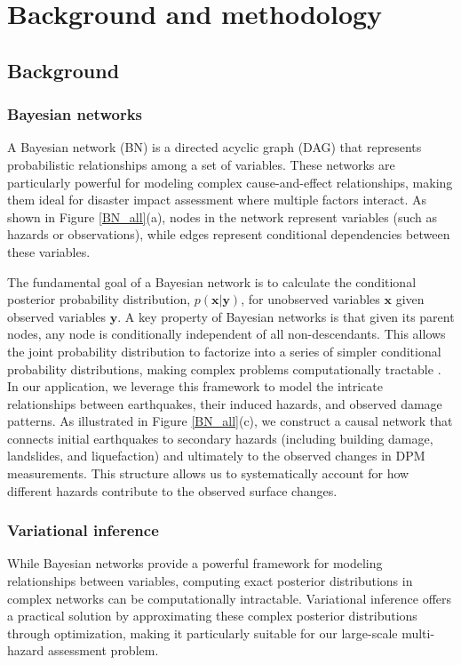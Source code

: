 \documentclass[review]{elsarticle}
\begin{document}
\section{Background and methodology}

\subsection{Background}
\subsubsection{Bayesian networks}
A Bayesian network (BN) is a directed acyclic graph (DAG) that represents probabilistic relationships among a set of variables. These networks are particularly powerful for modeling complex cause-and-effect relationships, making them ideal for disaster impact assessment where multiple factors interact. As shown in Figure \ref{BN_all}(a), nodes in the network represent variables (such as hazards or observations), while edges represent conditional dependencies between these variables.

The fundamental goal of a Bayesian network is to calculate the conditional posterior probability distribution, $p(\textbf{x}|\textbf{y})$, for unobserved variables $\textbf{x}$ given observed variables $\textbf{y}$. A key property of Bayesian networks is that given its parent nodes, any node is conditionally independent of all non-descendants. This allows the joint probability distribution to factorize into a series of simpler conditional probability distributions, making complex problems computationally tractable \cite{spiegelhalter1998bayesian}.
In our application, we leverage this framework to model the intricate relationships between earthquakes, their induced hazards, and observed damage patterns. As illustrated in Figure \ref{BN_all}(c), we construct a causal network that connects initial earthquakes to secondary hazards (including building damage, landslides, and liquefaction) and ultimately to the observed changes in DPM measurements. This structure allows us to systematically account for how different hazards contribute to the observed surface changes.


\subsubsection{Variational inference} While Bayesian networks provide a powerful framework for modeling relationships between variables, computing exact posterior distributions in complex networks can be computationally intractable. Variational inference offers a practical solution by approximating these complex posterior distributions through optimization, making it particularly suitable for our large-scale multi-hazard assessment problem.
\end{document}
